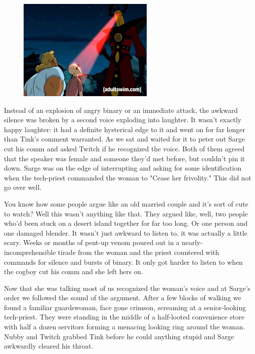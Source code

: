 \begin{figure}
	\begin{center}
		\includegraphics[width=\figwidth]{pics/11/18.png}
	\end{center}
\end{figure}
Instead of an explosion of angry binary or an immediate attack, the awkward silence was broken by a second voice exploding into laughter. 
It wasn't exactly happy laughter: 
it had a definite hysterical edge to it and went on for far longer than Tink's comment warranted. 
As we sat and waited for it to peter out Sarge cut his comm and asked Twitch if he recognized the voice. 
Both of them agreed that the speaker was female and someone they'd met before, but couldn't pin it down. 
Sarge was on the edge of interrupting and asking for some identification when the tech-priest commanded the woman to "Cease her frivolity." This did not go over well.

You know how some people argue like an old married couple and it's sort of cute to watch? 
Well this wasn't anything like that. 
They argued like, well, two people who'd been stuck on a desert island together for far too long. 
Or one person and one damaged blender. 
It wasn't just awkward to listen to, it was actually a little scary. 
Weeks or months of pent-up venom poured out in a nearly-incomprehensible tirade from the woman and the priest countered with commands for silence and bursts of binary. 
It only got harder to listen to when the cogboy cut his comm and she left hers on.

Now that she was talking most of us recognized the woman's voice and at Sarge's order we followed the sound of the argument. 
After a few blocks of walking we found a familiar guardswoman, face gone crimson, screaming at a senior-looking tech-priest. 
They were standing in the middle of a half-looted convenience store with half a dozen servitors forming a menacing looking ring around the woman. 
Nubby and Twitch grabbed Tink before he could anything stupid and Sarge awkwardly cleared his throat.

